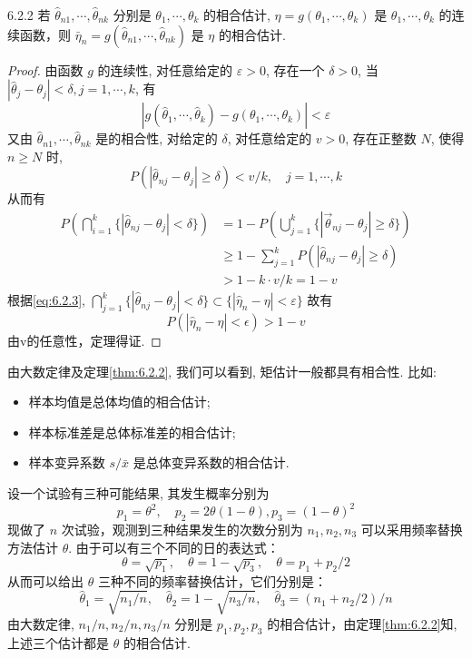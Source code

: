 \begin{theorem}{}{6.2.2} %
若 $\hat{\theta}_{n1},\cdots,\hat{\theta}_{nk}$ 分别是 $\theta_1,\cdots,\theta_k$ 的相合估计, $\eta=g(\theta_1,\cdots,\theta_k)$ 是 $\theta_1,\cdots,\theta_k$ 的连续函数，则 $\bar{\eta}_n=g(\hat{\theta}_{n1},\cdots,\hat{\theta}_{nk})$ 是 $\eta$ 的相合估计.
\end{theorem}
\begin{proof}
由函数 $g$ 的连续性, 对任意给定的 $\varepsilon>0$, 存在一个 $\delta>0$, 当 $|\hat{\theta}_j-\theta_j|<\delta,j=1,\cdots,k$, 有
\begin{equation}\label{eq:6.2.3}
|g(\hat{\theta}_{1}, \cdots, \hat{\theta}_{k})-g(\theta_{1}, \cdots, \theta_{k})|<\varepsilon
\end{equation}
又由 $\hat{\theta}_{n1},\cdots,\hat{\theta}_{nk}$ 是的相合性, 对给定的 $\delta$, 对任意给定的 $v>0$, 存在正整数 $N$, 使得 $n\geqslant N$ 时, 
\[P(|\hat{\theta}_{n j}-\theta_{j}| \geqslant \delta)<v / k, \quad j=1, \cdots, k\]
从而有
\begin{align*}
P\left(\bigcap_{i=1}^{k}\{|\hat{\theta}_{n j}-\theta_{j}|<\delta\}\right)
&=1-P\left(\bigcup_{j=1}^{k}\{ | \vec{\theta}_{n j}-\theta_{j} | \geqslant \delta\}\right)\\
&\geqslant 1-\sum_{j=1}^{k} P(|\hat{\theta}_{n j}-\theta_{j}| \geqslant \delta)\\
&>1-k \cdot v / k=1-v
\end{align*}
根据\eqref{eq:6.2.3}, $\bigcap_{j=1}^{k}\{|\hat{\theta}_{n j}-\theta_{j}|<\delta\} \subset\{ | \hat{\eta}_{n}-\eta |<\varepsilon \}$ 故有
\[P\left(\left|\hat{\eta}_{n}-\eta\right|<\epsilon\right)>1-v\]
由v的任意性，定理得证.
\end{proof}

由大数定律及定理\ref{thm:6.2.2}, 我们可以看到, 矩估计一般都具有相合性. 比如: 
\begin{itemize}
\item 样本均值是总体均值的相合估计;
\item 样本标准差是总体标准差的相合估计;
\item 样本变异系数 $s/\bar x$ 是总体变异系数的相合估计.
\end{itemize}

\begin{example}\label{exam:6.2.3}
设一个试验有三种可能结果, 其发生概率分别为
\[p_{1}=\theta^{2}, \quad p_{2}=2 \theta(1-\theta), p_{3}=(1-\theta)^{2}\]
现做了 $n$ 次试验，观测到三种结果发生的次数分别为 $n_1,n_2,n_3$ 可以采用频率替换方法估计 $\theta$. 由于可以有三个不同的日的表达式：
\[\theta=\sqrt{p_{1}}, \quad \theta=1-\sqrt{p_{3}}, \quad \theta=p_{1}+p_{2} / 2\]
从而可以给出 $\theta$ 三种不同的频率替换估计，它们分别是：
\[\hat{\theta}_{1}=\sqrt{n_{1} / n}, \quad \hat{\theta}_{2}=1-\sqrt{n_{3} / n}, \quad \hat{\theta}_{3}=\left(n_{1}+n_{2} / 2\right) / n\]
由大数定律, $n_1/n,n_2/n,n_3/n$ 分别是 $p_1,p_2,p_3$ 的相合估计，由定理\ref{thm:6.2.2}知, 上述三个估计都是 $\theta$ 的相合估计.
\end{example}

